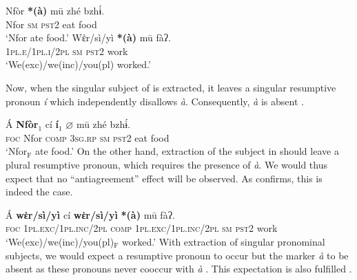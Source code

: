 \documentclass[output=paper]{langscibook}
\begin{document}
\ea\label{ex:johanneshein:insituSM}
\begin{xlist}
\ex \label{ex:johanneshein:insituSMa}
\gll Nfòr \textbf{*(à)} mū zhé bzhɨ́.\\
Nfor \hphantom{(*}\textsc{sm} \textsc{pst2} eat food\\
\glt `Nfor ate food.'
\ex \label{ex:johanneshein:insituSMb}
\gll Wὲr/sì/yì \textbf{*(à)} mū fàʔ.\\
\textsc{1pl.e/1pl.i/2pl} \hphantom{(*}\textsc{sm} \textsc{pst2} work\\
\glt `We(exc)/we(inc)/you(pl) worked.'
\end{xlist}
\z
Now, when the singular subject of  is extracted, it leaves a
singular resumptive pronoun \textit{í} which independently disallows
\textit{à}. Consequently, \textit{à} is absent .

\ea \label{ex:johanneshein:extractSM}
\gll Á \textbf{Nfòr}$_1$ cí \textbf{í$_1$} $\varnothing$ mū zhé bzhɨ́.\\
\textsc{foc} Nfor \textsc{comp} \textsc{3sg.rp} \textsc{sm} \textsc{pst2} eat food\\
\glt `Nfor$_{\text{F}}$ ate food.'
\z
On the other hand, extraction of the subject in  should leave
a plural resumptive pronoun, which requires the presence of
\textit{à}. We would thus expect that no ``antiagreement'' effect
will be observed. As  confirms, this is indeed the case.

\ea
\gll Á \textbf{wὲr/sì/yì} cí \textbf{wὲr/sì/yì} \textbf{*(à)} mū fàʔ.\label{ex:johanneshein:LDE-local-plural}\\
\textsc{foc} \textsc{1pl.exc/1pl.inc/2pl} \textsc{comp} \textsc{1pl.exc/1pl.inc/2pl} \hphantom{(*}\textsc{sm} \textsc{pst2} work\\
\glt `We(exc)/we(inc)/you(pl)$_{\text{F}}$ worked.'
\z
With extraction of singular pronominal subjects, we would expect a
resumptive pronoun to occur but the marker \textit{à} to be absent
as these pronouns never cooccur with \textit{à}
. This expectation is also fulfilled .
\end{document}
